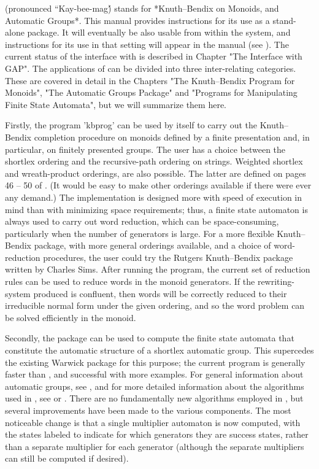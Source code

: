 {\KBMAG} (pronounced ``Kay-bee-mag\'\')
stands for *Knuth--Bendix on Monoids, and Automatic Groups*.
This manual provides instructions for its use as a stand-alone package.
It will eventually be also usable from within the {\GAP} system, and
instructions for its use in that setting will appear in the {\GAP} manual
(see \cite{Sch92}).
The current status of the interface with {\GAP} is described in Chapter
"The Interface with GAP".
The applications of {\KBMAG} can be divided into three inter-relating
categories. These are covered in detail in the Chapters
"The Knuth--Bendix Program for Monoids",
"The Automatic Groups Package" and
"Programs for Manipulating Finite State Automata",
but we will summarize them here.

Firstly, the program 'kbprog' can be used by itself to carry out the
Knuth--Bendix completion procedure on monoids defined by a finite presentation
and, in particular, on finitely presented groups. The user has a choice
between the shortlex ordering and the recursive-path ordering on strings.
Weighted shortlex and wreath-product orderings, are also possible.
The latter are defined on pages 46 -- 50 of \cite{Sims94}.
(It would be easy to make other orderings available if there were ever any
demand.) The implementation is designed more with speed of execution in mind
than with minimizing space requirements; thus, a finite state automaton is
always used to carry out word reduction, which can be space-consuming,
particularly when the number of generators is large. For a more flexible
Knuth--Bendix package, with more general orderings available, and a
choice of word-reduction procedures, the user could try the Rutgers
Knuth--Bendix package {\rkbp} written by Charles Sims. 
After running the program, the current set of reduction rules can be used to
reduce words in the monoid generators. If the rewriting-system produced is
confluent, then words will be correctly reduced to their irreducible normal
form under the given ordering, and so the word problem can be solved efficiently
in the monoid.

Secondly, the package can be used to compute the finite state automata
that constitute the automatic structure of a shortlex automatic group.
This supercedes the existing Warwick {\Automata} package for this purpose;
the current program is generally faster than {\Automata}, and successful with
more examples. For general information about automatic groups, see
\cite{ECHLPT92}, and for more detailed information about the algorithms
used in {\Automata}, see \cite{EHR91} or \cite{Holt94}. There are 
no fundamentally new algorithms employed in {\KBMAG}, but several
improvements have been made to the various components. The most
noticeable change is that a single multiplier automaton is now computed,
with the states labeled to indicate for which generators they are success
states, rather than a separate multiplier for each generator (although the
separate multipliers can still be computed if desired).

